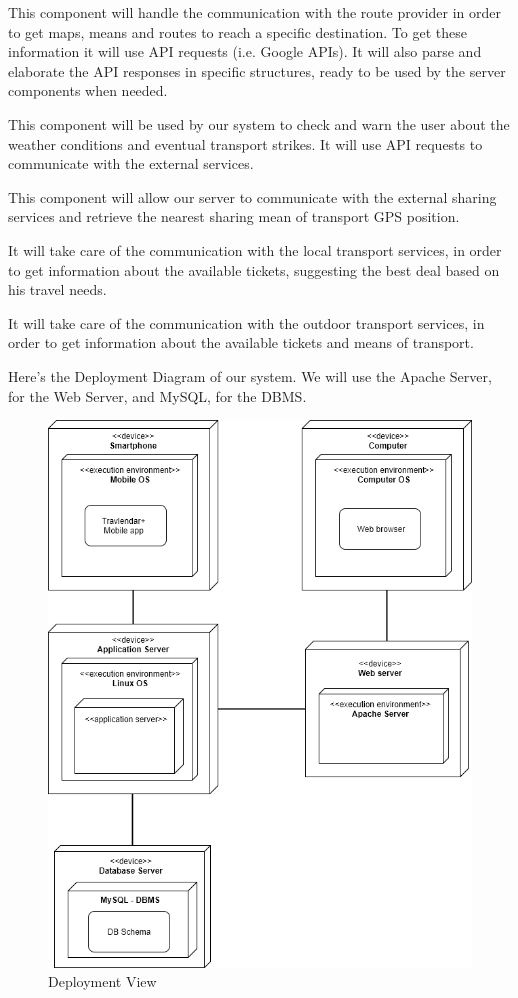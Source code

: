 This component will handle the communication with the route provider in order to get maps, means and routes to reach a specific destination. To get these information it will use API requests (i.e. Google APIs).
It will also parse and elaborate the API responses in specific structures, ready to be used by the server components when needed.

This component will be used by our system to check and warn the user about the weather conditions and eventual transport strikes.
It will use API requests to communicate with the external services.

This component will allow our server to communicate with the external sharing services and retrieve the nearest sharing mean of transport GPS position.

It will take care of the communication with the local transport services, in order to get information about the available tickets, suggesting the best deal based on his travel needs.

It will take care of the communication with the outdoor transport services, in order to get information about the available tickets and means of transport.

Here's the Deployment Diagram of our system. We will use the Apache Server, for the Web Server, and MySQL, for the DBMS.
\begin{figure}[H]
	\centering
	\includegraphics[scale=0.3]{Images/Architecture/Deployment_View}
	\caption{Deployment View}
\end{figure}

